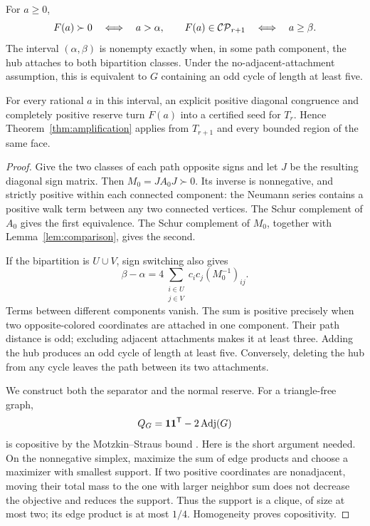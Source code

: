 \begin{theorem}\label{thm:seedinterval}
For $a\ge0$,
\[
 F(a)\succ0\quad\Longleftrightarrow\quad a>\alpha,
 \qquad
 F(a)\in\mathcal{CP}_{r+1}\quad\Longleftrightarrow\quad a\ge\beta.
\]
The interval $(\alpha,\beta)$ is nonempty exactly when, in some path component, the hub attaches to both bipartition classes. Under the no-adjacent-attachment assumption, this is equivalent to $G$ containing an odd cycle of length at least five.

For every rational $a$ in this interval, an explicit positive diagonal congruence and completely positive reserve turn $F(a)$ into a certified seed for $T_r$. Hence Theorem~\ref{thm:amplification} applies from $T_{r+1}$ and every bounded region of the same face.
\end{theorem}
\begin{proof}
Give the two classes of each path opposite signs and let $J$ be the resulting diagonal sign matrix. Then $M_0=JA_0J\succ0$. Its inverse is nonnegative, and strictly positive within each connected component: the Neumann series contains a positive walk term between any two connected vertices. The Schur complement of $A_0$ gives the first equivalence. The Schur complement of $M_0$, together with Lemma~\ref{lem:comparison}, gives the second.

If the bipartition is $U\cup V$, sign switching also gives
\begin{equation}\label{eq:thresholdgap}
 \beta-\alpha
 =4\sum_{\substack{i\in U\\j\in V}}c_ic_j(M_0^{-1})_{ij}.
\end{equation}
Terms between different components vanish. The sum is positive precisely when two opposite-colored coordinates are attached in one component. Their path distance is odd; excluding adjacent attachments makes it at least three. Adding the hub produces an odd cycle of length at least five. Conversely, deleting the hub from any cycle leaves the path between its two attachments.

We construct both the separator and the normal reserve. For a triangle-free graph,
\[
 Q_G=\mathbf1\mathbf1^{\mathsf T}-2\operatorname{Adj}(G)
\]
is copositive by the Motzkin--Straus bound \cite{MS}. Here is the short argument needed. On the nonnegative simplex, maximize the sum of edge products and choose a maximizer with smallest support. If two positive coordinates are nonadjacent, moving their total mass to the one with larger neighbor sum does not decrease the objective and reduces the support. Thus the support is a clique, of size at most two; its edge product is at most $1/4$. Homogeneity proves copositivity.


\end{proof}
